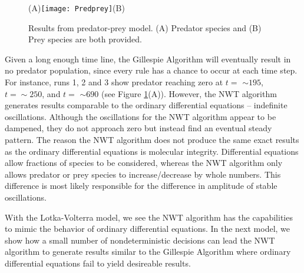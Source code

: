 \documentclass[copyright]{eptcs}
\begin{document}
\begin{figure}[ht]
\centering
(A)\texttt{[image: Predprey]}(B)
\caption{Results from predator-prey model.  (A) Predator species and (B) Prey species are both provided.}
\label{predprey}
\end{figure}

Given a long enough time line, the Gillespie Algorithm will eventually result in no predator population, since every rule has a chance to occur at each time step.  For instance, runs 1, 2 and 3 show predator reaching zero at $t= $ $\sim195$, \hbox{$t= \sim250$}, and $t= $ $\sim690$ (see Figure \ref{predprey}(A)).  However, the NWT algorithm generates results comparable to the ordinary differential equations -- indefinite oscillations.  Although the oscillations for the NWT algorithm appear to be dampened, they do not approach zero but instead find an eventual steady pattern.  The reason the NWT algorithm does not produce the same exact results as the ordinary differential equations is molecular integrity.  Differential equations allow fractions of species to be considered, whereas the NWT algorithm only allows predator or prey species to increase/decrease by whole numbers. This difference is most likely responsible for the difference in amplitude of stable oscillations.

With the Lotka-Volterra model, we see the NWT algorithm has the capabilities to mimic the behavior of ordinary differential equations.  In the next model, we show how a small number of nondeterministic decisions can lead the NWT algorithm to generate results similar to the Gillespie Algorithm where ordinary differential equations fail to yield desireable results.
\end{document}
